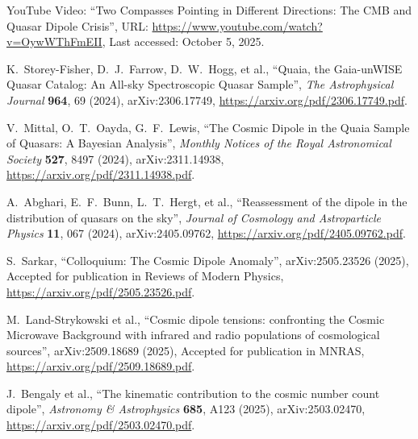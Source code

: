 \documentclass{article}
\begin{document}
	\begin{thebibliography}{9}
		
		YouTube Video: ``Two Compasses Pointing in Different Directions: The CMB and Quasar Dipole Crisis'', 
		URL: \url{https://www.youtube.com/watch?v=OywWThFmEII}, 
		Last accessed: October 5, 2025.
		
		K.~Storey-Fisher, D.~J.~Farrow, D.~W.~Hogg, et al.,
		``Quaia, the Gaia-unWISE Quasar Catalog: An All-sky Spectroscopic Quasar Sample'',
		\emph{The Astrophysical Journal} \textbf{964}, 69 (2024),
		arXiv:2306.17749,
		\url{https://arxiv.org/pdf/2306.17749.pdf}.
		
		V.~Mittal, O.~T.~Oayda, G.~F.~Lewis,
		``The Cosmic Dipole in the Quaia Sample of Quasars: A Bayesian Analysis'',
		\emph{Monthly Notices of the Royal Astronomical Society} \textbf{527}, 8497 (2024),
		arXiv:2311.14938,
		\url{https://arxiv.org/pdf/2311.14938.pdf}.
		
		A.~Abghari, E.~F.~Bunn, L.~T.~Hergt, et al.,
		``Reassessment of the dipole in the distribution of quasars on the sky'',
		\emph{Journal of Cosmology and Astroparticle Physics} \textbf{11}, 067 (2024),
		arXiv:2405.09762,
		\url{https://arxiv.org/pdf/2405.09762.pdf}.
		
		S.~Sarkar,
		``Colloquium: The Cosmic Dipole Anomaly'',
		arXiv:2505.23526 (2025),
		Accepted for publication in Reviews of Modern Physics,
		\url{https://arxiv.org/pdf/2505.23526.pdf}.
		
		M.~Land-Strykowski et al.,
		``Cosmic dipole tensions: confronting the Cosmic Microwave Background with infrared and radio populations of cosmological sources'',
		arXiv:2509.18689 (2025),
		Accepted for publication in MNRAS,
		\url{https://arxiv.org/pdf/2509.18689.pdf}.
		
		J.~Bengaly et al.,
		``The kinematic contribution to the cosmic number count dipole'',
		\emph{Astronomy \& Astrophysics} \textbf{685}, A123 (2025),
		arXiv:2503.02470,
		\url{https://arxiv.org/pdf/2503.02470.pdf}.
		
	\end{thebibliography}
	
\end{document}
